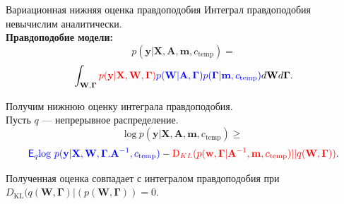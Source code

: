 \documentclass[usenames,dvipsnames,11pt,pdf,utf8,russian,aspectratio=169]{beamer}
\begin{document}
\begin{frame}{Вариационная нижняя оценка правдоподобия} 
Интеграл правдоподобия невычислим аналитически.\\
\textbf{Правдоподобие модели:}
\[
p(\mathbf{y}|\mathbf{X},\mathbf{A},\mathbf{m}, c_{\text{temp}}) =
\]
\[
 \int_{\mathbf{W}, \boldsymbol{\Gamma} } \textcolor{red}{p(\mathbf{y}|\mathbf{X},\mathbf{W},  \boldsymbol{\Gamma})} \textcolor{blue}{p(\mathbf{W}|\mathbf{A}, \boldsymbol{\Gamma})p(\boldsymbol{\Gamma}|\mathbf{m}, c_{\text{temp}})} d\mathbf{W}d{\boldsymbol{\Gamma}}.                         
\]

Получим нижнюю оценку интеграла правдоподобия.\\
Пусть $q$ --- непрерывное распределение.
$$                                                                                                                                              
        \text{log}~p(\mathbf{y}|\mathbf{X},\mathbf{A},\mathbf{m}, c_{\text{temp}}) \geq 
$$          
$$
\textcolor{blue}{\mathsf{E}_q \text{log}~{p(\mathbf{y} | \mathbf{X}, \mathbf{W}, \boldsymbol{\Gamma}. \mathbf{A}^{-1}, c_{\text{temp}})}} - \textcolor{red}{\text{D}_{KL}(p(\mathbf{w}, \boldsymbol{\Gamma} |\mathbf{A}^{-1}, \mathbf{m}, c_{\text{temp}}) || q(\mathbf{W}, \boldsymbol{\Gamma}))}.
$$ 

Полученная оценка совпадает с интегралом правдоподобия при $D_\text{KL}(q(\mathbf{W}, \boldsymbol{\Gamma})|(p(\mathbf{W}, \boldsymbol{\Gamma}))=0$.

\end{frame}      
   
\end{document}
